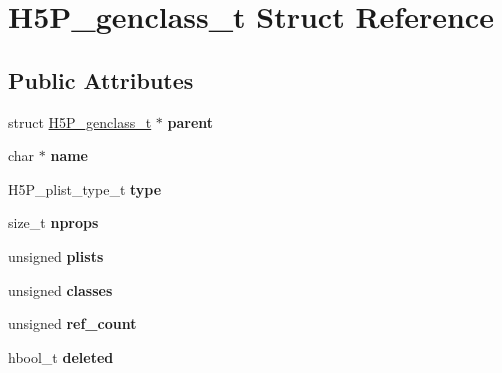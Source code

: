 \hypertarget{struct_h5_p__genclass__t}{}\section{H5\+P\+\_\+genclass\+\_\+t Struct Reference}
\label{struct_h5_p__genclass__t}
\subsection*{Public Attributes}
\begin{DoxyCompactItemize}
\item 
\mbox{\label{struct_h5_p__genclass__t_ac228c26b0e148b5e8167cd1137666ca9}} 
struct \hyperlink{struct_h5_p__genclass__t}{H5\+P\+\_\+genclass\+\_\+t} $\ast$ {\bfseries parent}
\item 
\mbox{\label{struct_h5_p__genclass__t_ade036347f2a7d4d9a2e46211b50e11d3}} 
char $\ast$ {\bfseries name}
\item 
\mbox{\label{struct_h5_p__genclass__t_a98786687315000d4b647823244d25e67}} 
H5\+P\+\_\+plist\+\_\+type\+\_\+t {\bfseries type}
\item 
\mbox{\label{struct_h5_p__genclass__t_acd81dc2fa20f44d46f3e090e9267c737}} 
size\+\_\+t {\bfseries nprops}
\item 
\mbox{\label{struct_h5_p__genclass__t_ac70a115fee6fb38f20513ea1550f0b33}} 
unsigned {\bfseries plists}
\item 
\mbox{\label{struct_h5_p__genclass__t_a61ffbe4d70cb068aa9b6aa334b288d69}} 
unsigned {\bfseries classes}
\item 
\mbox{\label{struct_h5_p__genclass__t_ab6bd22feb672f9ac804d4800e8990d54}} 
unsigned {\bfseries ref\+\_\+count}
\item 
\mbox{\label{struct_h5_p__genclass__t_a6621c044e319b2073e83d628406f79d5}} 
hbool\+\_\+t {\bfseries deleted}
\item 
\mbox{\label{struct_h5_p__genclass__t_aef0ade4a1aa79b956895c110d8a8316c}} 

\end{DoxyCompactItemize}
